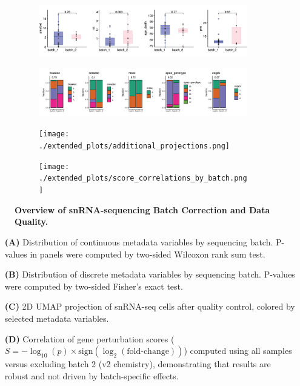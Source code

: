 \documentclass[12pt]{article}
\begin{document}
\begin{figure}[H]
    \begin{subfigure}[t]{\textwidth}
        \caption{}
        \includegraphics[width=\textwidth]{./extended_plots/seq_batch_cont.png}        
    \end{subfigure}
    \begin{subfigure}[t]{\textwidth}
        \caption{}
        \includegraphics[width=\textwidth]{./extended_plots/seq_batch_cat.png}        
    \end{subfigure}  
    \begin{subfigure}[t]{\textwidth}
        \caption{}
        \texttt{[image: ./extended\_plots/additional\_projections.png]}        
    \end{subfigure}   
    \begin{subfigure}[t]{\textwidth}
        \caption{}
        \texttt{[image: ./extended\_plots/score\_correlations\_by\_batch.png]}        
    \end{subfigure}   
    \caption{
        \textbf{Overview of snRNA-sequencing Batch Correction and Data Quality.}\\
    }
    \label{fig:snRNA_batch_quality}
\end{figure}
\begin{itemize}
    \item[\textbf{(A)}] Distribution of continuous metadata variables by sequencing batch. P-values in panels were computed by two-sided Wilcoxon rank sum test.
    \item[\textbf{(B)}] Distribution of discrete metadata variables by sequencing batch. P-values were computed by two-sided Fisher's exact test.
    \item[\textbf{(C)}] 2D UMAP projection of snRNA-seq cells after quality control, colored by selected metadata variables.
    \item[\textbf{(D)}] Correlation of gene perturbation scores ($S = -\log_{10}(p)\times\text{sign}(\log_2(\text{fold-change}))$) computed using all samples versus excluding batch 2 (v2 chemistry), demonstrating that results are robust and not driven by batch-specific effects.
\end{itemize} \clearpage
\end{document}
